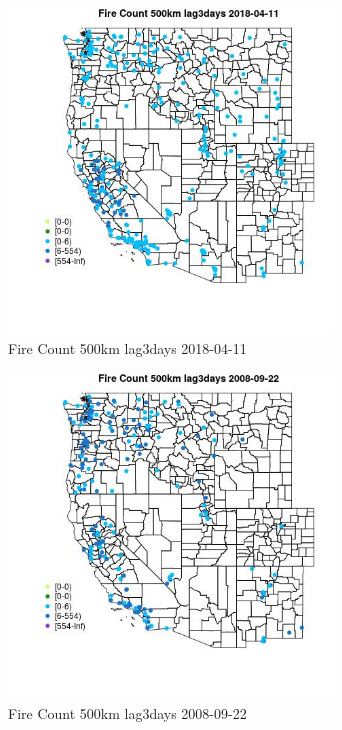 \begin{figure} 
\centering  
\includegraphics[width=0.77\textwidth]{Code_Outputs/Report_ML_input_PM25_Step4_part_e_de_duplicated_aves_compiled_2019-05-18wNAs_MapObsFire_Count_500km_lag3days2018-04-11.jpg} 
\caption{\label{fig:Report_ML_input_PM25_Step4_part_e_de_duplicated_aves_compiled_2019-05-18wNAsMapObsFire_Count_500km_lag3days2018-04-11}Fire Count 500km lag3days 2018-04-11} 
\end{figure} 
 

\begin{figure} 
\centering  
\includegraphics[width=0.77\textwidth]{Code_Outputs/Report_ML_input_PM25_Step4_part_e_de_duplicated_aves_compiled_2019-05-18wNAs_MapObsFire_Count_500km_lag3days2008-09-22.jpg} 
\caption{\label{fig:Report_ML_input_PM25_Step4_part_e_de_duplicated_aves_compiled_2019-05-18wNAsMapObsFire_Count_500km_lag3days2008-09-22}Fire Count 500km lag3days 2008-09-22} 
\end{figure} 
 

